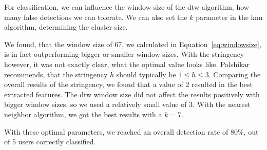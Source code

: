 For classification, we can influence the window size of the \gls{dtw} algorithm, \ie how many false detections we can tolerate. We can also set the $k$ parameter in the \gls{knn} algorithm, determining the cluster size.

We found, that the window size of 67, we calculated in Equation~\ref{eq:windowsize}, is in fact outperforming bigger or smaller window sizes. With the stringency however, it was not exactly clear, what the optimal value looks like. Palshikar \cite{palshikar2009simple} recommends, that the stringency $h$ should typically be $1 \leq h \leq 3$. Comparing the overall results of the stringency, we found that a value of 2 resulted in the best extracted features. The \gls{dtw} window size did not affect the results positively with bigger window sizes, so we used a relatively small value of 3. With the nearest neighbor algorithm, we got the best results with a $k = 7$.

With these optimal parameters, we reached an overall detection rate of 80\%,  out of 5 users correctly classified.